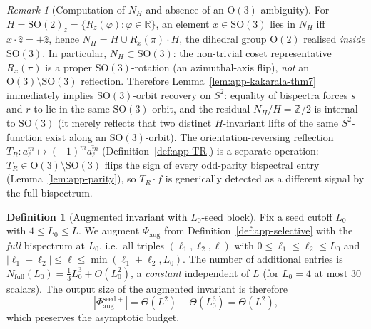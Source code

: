 \documentclass{article}
\theoremstyle{definition}
\newtheorem{definition}[theorem]{Definition}
\theoremstyle{remark}
\newtheorem{remark}[theorem]{Remark}
\newcommand{\R}{\mathbb{R}}
\newcommand{\SO}{\mathrm{SO}}
\newcommand{\OG}{\mathrm{O}}
\newcommand{\conj}[1]{\overline{#1}}
\theoremstyle{definition}
\begin{document}
\begin{remark}[Computation of $N_H$ and absence of an $\OG(3)$ ambiguity]
\label{rem:app-NH}
For $H = \SO(2)_z = \{R_z(\varphi) : \varphi \in \R\}$, an element
$x \in \SO(3)$ lies in $N_H$ iff $x \cdot \hat z = \pm \hat z$, hence
$N_H = H \cup R_x(\pi) \cdot H$, the dihedral group $\OG(2)$
realised \emph{inside} $\SO(3)$. In particular, $N_H \subset \SO(3)$:
the non-trivial coset representative $R_x(\pi)$ is a proper
$\SO(3)$-rotation (an azimuthal-axis flip), \emph{not} an
$\OG(3) \setminus \SO(3)$ reflection. Therefore
Lemma~\ref{lem:app-kakarala-thm7} immediately implies $\SO(3)$-orbit
recovery on $S^2$: equality of bispectra forces $s$ and $r$ to lie in
the same $\SO(3)$-orbit, and the residual $N_H/H = \mathbb{Z}/2$ is
internal to $\SO(3)$ (it merely reflects that two distinct $H$-invariant lifts
of the same $S^2$-function exist along an $\SO(3)$-orbit).
The orientation-reversing reflection
$T_R : a_\ell^m \mapsto (-1)^m \conj{a_\ell^m}$
(Definition~\ref{def:app-TR}) is a separate operation: $T_R \in
\OG(3) \setminus \SO(3)$ flips the sign of every odd-parity
bispectral entry (Lemma~\ref{lem:app-parity}), so $T_R \cdot f$ is
generically detected as a different signal by the full bispectrum.
\end{remark}

\begin{definition}[Augmented invariant with $L_0$-seed block]
\label{def:app-Phi-aug-L0}
Fix a seed cutoff $L_0$ with $4 \le L_0 \le L$.  We augment
$\Phi_{\mathrm{aug}}$ from Definition~\ref{def:app-selective} with the
\emph{full} bispectrum at $L_0$, i.e.\ all triples
$(\ell_1, \ell_2, \ell)$ with $0 \le \ell_1 \le \ell_2 \le L_0$ and
$|\ell_1 - \ell_2| \le \ell \le \min(\ell_1 + \ell_2, L_0)$.
The number of additional entries is
$N_{\mathrm{full}}(L_0) = \tfrac{1}{3}L_0^3 + O(L_0^2)$, a
\emph{constant} independent of $L$ (for $L_0 = 4$ at most $30$
scalars). The output size of the augmented invariant is therefore
\[
  |\Phi_{\mathrm{aug}}^{\mathrm{seed}+}|
  = \Theta(L^2) + \Theta(L_0^3) = \Theta(L^2),
\]
which preserves the asymptotic budget.
\end{definition}
\end{document}
